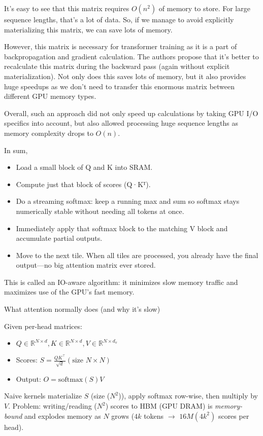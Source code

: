 It's easy to see that this matrix requires $O(n^2)$ of memory to store. For large sequence lengths, that's a lot of data. So, if we manage to avoid explicitly materializing this matrix, we can save lots of memory.

However, this matrix is necessary for transformer training as it is a part of backpropagation and gradient calculation. The authors propose that it's better to recalculate this matrix during the backward pass (again without explicit materialization). Not only does this saves lots of memory, but it also provides huge speedups as we don't need to transfer this enormous matrix between different GPU memory types.

Overall, such an approach did not only speed up calculations by taking GPU I/O specifics into account, but also allowed processing huge sequence lengths as memory complexity drops to $O(n)$.


In sum,
\begin{itemize}
	\item Load a small block of Q and K into SRAM.
	\item Compute just that block of scores (Q·Kᵀ).
	\item Do a streaming softmax: keep a running max and sum so softmax stays numerically stable without needing all tokens at once.
	\item Immediately apply that softmax block to the matching V block and accumulate partial outputs.
	\item Move to the next tile. When all tiles are processed, you already have the final output—no big attention matrix ever stored.
\end{itemize}
This is called an IO-aware algorithm: it minimizes slow memory traffic and maximizes use of the GPU's fast memory.

What attention normally does (and why it's slow)

Given per-head matrices:
\begin{itemize}
	\item$Q \in \mathbb{R}^{N\times d}, K \in \mathbb{R}^{N\times d}, V \in \mathbb{R}^{N\times d_v}$ 
	\item Scores: $S = \frac{QK^\top}{\sqrt{d}}  (\text{size } N\times N)$
	\item Output: $O = \mathrm{softmax}(S)V$
\end{itemize}
Naive kernels materialize $S$ (size ($N^2$)), apply softmax row-wise, then multiply by $V$.
Problem: writing/reading ($N^2$) scores to HBM (GPU DRAM) is \textit{memory-bound} and explodes memory as $N$ grows (\eg $4k$ tokens $\to$ $16M (4k^2)$ scores per head).

